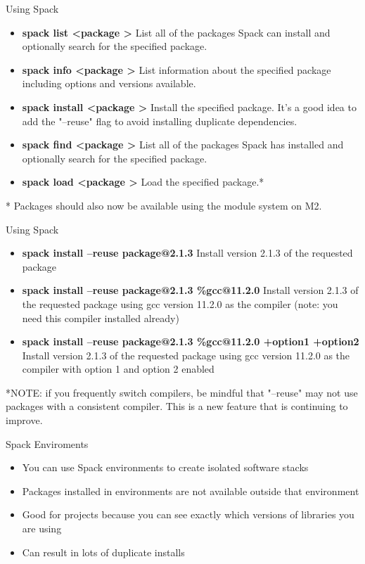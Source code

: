 \begin{frame}{Using Spack}
	\begin{itemize}
		\item \textbf{spack list \textless package \textgreater} List all of the packages Spack can install and optionally search for the specified package.
		\item \textbf{spack info \textless package \textgreater} List information about the specified package including options and versions available.
		\item \textbf{spack install \textless package \textgreater} Install the specified package. It's a good idea to add the "--reuse" flag to avoid installing duplicate dependencies.
		\item \textbf{spack find \textless package \textgreater} List all of the packages Spack has installed and optionally search for the specified package.
		\item \textbf{spack load \textless package \textgreater} Load the specified package.*
	\end{itemize}

* Packages should also now be available using the module system on M2.
\end{frame}

\begin{frame}{Using Spack}
	\begin{itemize}
		\item \textbf{spack install --reuse package@2.1.3 } Install version 2.1.3 of the requested package
		\item \textbf{spack install --reuse package@2.1.3 \%gcc@11.2.0 } Install version 2.1.3 of the requested package using gcc version 11.2.0 as the compiler (note: you need this compiler installed already)
		\item \textbf{spack install --reuse package@2.1.3 \%gcc@11.2.0 +option1 +option2 } Install version 2.1.3 of the requested package using gcc version 11.2.0 as the compiler with option 1 and option 2 enabled
	\end{itemize}

*NOTE: if you frequently switch compilers, be mindful that "--reuse" may not use packages with a consistent compiler. This is a new feature that is continuing to improve.
\end{frame}

\begin{frame}{Spack Enviroments}
	\begin{itemize}
		\item You can use Spack environments to create isolated software stacks
		\item Packages installed in environments are not available outside that environment
		\item Good for projects because you can see exactly which versions of libraries you are using
		\item Can result in lots of duplicate installs
	\end{itemize}
\end{frame}

